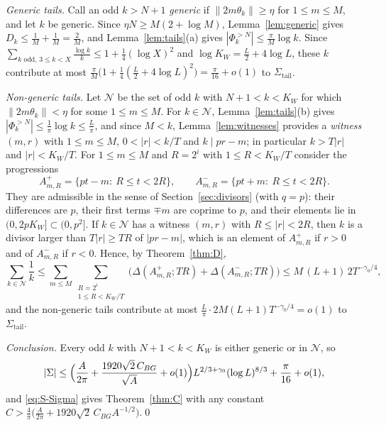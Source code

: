 \emph{Generic tails.} Call an odd $k>N+1$ \emph{generic} if $\|2m\theta_k\|\ge\eta$ for $1\le m\le M$, and let $k$ be generic. Since
$\eta N\ge M(2+\log M)$, Lemma~\ref{lem:generic} gives $D_k\le\frac1M+\frac1M=\frac2M$, and
Lemma~\ref{lem:tails}(a) gives $|\Phi_k^{>N}|\le\frac\pi M\log k$. Since
$\sum_{k\text{ odd},\,3\le k<X}\frac{\log k}k\le1+\frac14(\log X)^2$ and $\log K_W=\frac L2+4\log L$, these $k$
contribute at most $\frac\pi M\bigl(1+\frac14(\frac L2+4\log L)^2\bigr)=\frac\pi{16}+o(1)$ to $\Sigma_{\mathrm{tail}}$.

\emph{Non-generic tails.} Let $\mathcal{N}$ be the set of odd $k$ with $N+1<k<K_W$ for which $\|2m\theta_k\|<\eta$ for
some $1\le m\le M$. For $k\in\mathcal{N}$, Lemma~\ref{lem:tails}(b) gives $|\Phi_k^{>N}|\le\frac1\pi\log
k\le\frac L\pi$, and since $M<k$, Lemma~\ref{lem:witnesses} provides a \emph{witness} $(m,r)$ with $1\le m\le M$,
$0<|r|<k/T$ and $k\mid pr-m$; in particular $k>T|r|$ and $|r|<K_W/T$. For $1\le m\le M$ and $R=2^i$ with
$1\le R<K_W/T$ consider the progressions
\[
A^+_{m,R}=\{pt-m:\ R\le t<2R\},\qquad A^-_{m,R}=\{pt+m:\ R\le t<2R\}.
\]
They are admissible in the sense of Section~\ref{sec:divisors} (with $q=p$): their differences are $p$, their
first terms $\mp m$ are coprime to $p$, and their elements lie in $(0,2pK_W]\subset(0,p^2]$. If $k\in\mathcal{N}$ has
a witness $(m,r)$ with $R\le|r|<2R$, then $k$ is a divisor larger than $T|r|\ge TR$ of $|pr-m|$, which is an element
of $A^+_{m,R}$ if $r>0$ and of $A^-_{m,R}$ if $r<0$. Hence, by Theorem~\ref{thm:D},
\[
\sum_{k\in\mathcal{N}}\frac1k\le\sum_{m\le M}\sum_{\substack{R=2^i\\ 1\le R<K_W/T}}\bigl(\Delta(A^+_{m,R};TR)+
\Delta(A^-_{m,R};TR)\bigr)\le M\,(L+1)\,2T^{-\gamma_0/4},
\]
and the non-generic tails contribute at most $\frac L\pi\cdot2M(L+1)T^{-\gamma_0/4}=o(1)$ to
$\Sigma_{\mathrm{tail}}$.

\emph{Conclusion.} Every odd $k$ with $N+1<k<K_W$ is either generic or in $\mathcal{N}$, so
\[
|\Sigma|\le\Bigl(\frac A{2\pi}+\frac{1920\sqrt2\,C_{BG}}{\sqrt A}+o(1)\Bigr)L^{2/3+\gamma_0}(\log L)^{8/3}+\frac\pi{16}+o(1),
\]
and \eqref{eq:S-Sigma} gives Theorem~\ref{thm:C} with any constant
$C>\frac4\pi\bigl(\frac A{2\pi}+1920\sqrt2\,C_{BG}A^{-1/2}\bigr)$.\qed


